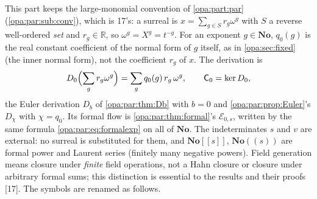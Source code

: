 \documentclass[11pt,oneside]{article}
\numberwithin{equation}{section}
\theoremstyle{definition}
\theoremstyle{remark}
\newcommand{\No}{\mathbf{No}}
\newcommand{\R}{\mathbb R}
\newcommand{\EE}{\mathcal E}
\newcommand{\src}[1]{\textup{\textsf{\small[#1]}}}
\begin{document}
This part keeps the large-monomial convention of \cref{opa:part:par} (\cref{opa:par:sub:conv}), which is 17's: a
surreal is $x=\sum_{g\in S}r_g\omega^g$ with $S$ a reverse well-ordered \emph{set} and $r_g\in\R$, so
$\omega^g=X^g=t^{-g}$. For an exponent $g\in\No$, $q_0(g)$ is the real constant coefficient of the normal form of $g$
itself, as in \cref{opa:sec:fixed} (the inner normal form), not the coefficient $r_g$ of $x$. The derivation is
\begin{equation}\label{opa:of:eq:D}
 D_0\Bigl(\sum_g r_g\omega^g\Bigr)=\sum_g q_0(g)\,r_g\,\omega^g,\qquad
 \mathsf C_0=\ker D_0,
\end{equation}
the Euler derivation $D_b$ of \cref{opa:par:thm:Db} with $b=0$ and \cref{opa:par:prop:Euler}'s $D_\chi$ with
$\chi=q_0$. Its formal flow is \cref{opa:par:thm:formal}'s $\EE_{0,s}$, written by the same formula
\eqref{opa:par:eq:formalexp} on all of $\No$. The indeterminates $s$ and $v$ are external: no surreal is substituted
for them, and $\No[[s]]$, $\No((s))$ are formal power and Laurent series (finitely many negative powers). Field
generation means closure under \emph{finite} field operations, not a Hahn closure or closure under arbitrary formal
sums; this distinction is essential to the results and their proofs \src{17}. The symbols are renamed as follows.
\end{document}
